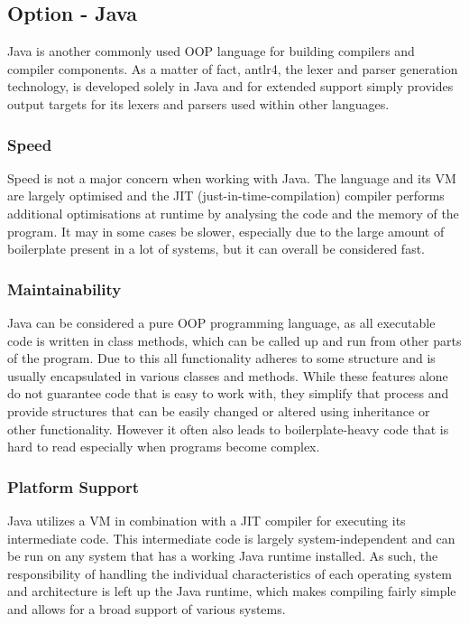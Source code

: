 \subsection{Option - Java}
\label{sec:programming-language-option-java}

Java is another commonly used OOP language for building compilers and compiler components. As a matter of fact, \Gls{antlr4}, the lexer and parser generation technology, is developed solely in Java and for extended support simply provides output targets for its lexers and parsers used within other languages.

\subsubsection{Speed}

Speed is not a major concern when working with Java. The language and its VM are largely optimised and the JIT (\Gls{just-in-time-compilation}) compiler performs additional optimisations at runtime by analysing the code and the memory of the program. It may in some cases be slower, especially due to the large amount of boilerplate present in a lot of systems, but it can overall be considered fast.

\subsubsection{Maintainability}

Java can be considered a pure OOP programming language, as all executable code is written in class methods, which can be called up and run from other parts of the program. Due to this all functionality adheres to some structure and is usually encapsulated in various classes and methods. While these features alone do not guarantee code that is easy to work with, they simplify that process and provide structures that can be easily changed or altered using inheritance or other functionality. However it often also leads to boilerplate-heavy code that is hard to read especially when programs become complex.

\subsubsection{Platform Support}

Java utilizes a VM in combination with a JIT compiler for executing its intermediate code. This intermediate code is largely system-independent and can be run on any system that has a working Java runtime installed. As such, the responsibility of handling the individual characteristics of each operating system and architecture is left up the Java runtime, which makes compiling fairly simple and allows for a broad support of various systems.

